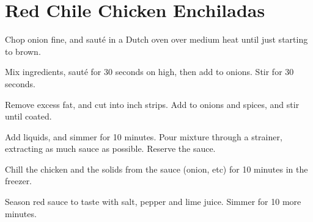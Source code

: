 \section{Red Chile Chicken Enchiladas}
\begin{recipe}


Chop onion fine, and sauté in a Dutch oven over medium heat until just starting to brown.


Mix ingredients, sauté for 30 seconds on high, then add to onions. Stir for 30 seconds.


Remove excess fat, and cut into  inch strips. Add to onions and spices, and stir until coated.


Add liquids, and simmer for 10 minutes. Pour mixture through a strainer, extracting as much sauce as possible. Reserve the sauce.

Chill the chicken and the solids from the sauce (onion, etc) for 10 minutes in the freezer.

Season red sauce to taste with salt, pepper and lime juice. Simmer for 10 more minutes.



\end{recipe}
